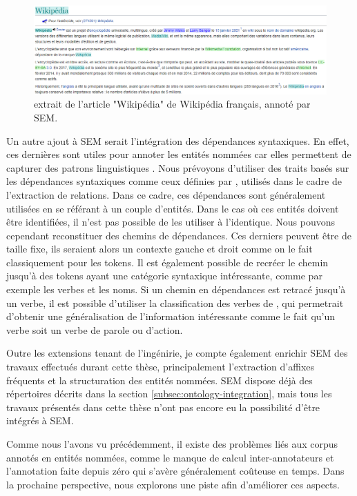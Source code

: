 \documentclass[PhD-Yoann-Dupont.tex]{subfiles}
\begin{document}
\begin{figure}[ht!]
\centering
\includegraphics[scale=0.5]{images/SEM/futur-sem-Wikipedia}
\caption{extrait de l'article "Wikipédia" de Wikipédia français, annoté par SEM.}
\label{fig:sem-wikipedia}
\end{figure}

Un autre ajout à SEM serait l'intégration des dépendances syntaxiques. En effet, ces dernières sont utiles pour annoter les entités nommées car elles permettent de capturer des patrons linguistiques \citep{nguyen2016j,jie2017efficient}. Nous prévoyons d'utiliser des traits basés sur les dépendances syntaxiques comme ceux définies par \citet{mintz2009distant}, utilisés dans le cadre de l'extraction de relations. Dans ce cadre, ces dépendances sont généralement utilisées en se référant à un couple d'entités. Dans le cas où ces entités doivent être identifiées, il n'est pas possible de les utiliser à l'identique. Nous pouvons cependant reconstituer des chemins de dépendances. Ces derniers peuvent être de taille fixe, ils seraient alors un contexte gauche et droit comme on le fait classiquement pour les tokens. Il est également possible de recréer le chemin jusqu'à des tokens ayant une catégorie syntaxique intéressante, comme par exemple les verbes et les noms. Si un chemin en dépendances est retracé jusqu'à un verbe, il est possible d'utiliser la classification des verbes de \citet{dubois1997synonymie}, qui permetrait d'obtenir une généralisation de l'information intéressante comme le fait qu'un verbe soit un verbe de parole ou d'action.

Outre les extensions tenant de l'ingénirie, je compte également enrichir SEM des travaux effectués durant cette thèse, principalement l'extraction d'affixes fréquents et la structuration des entités nommées. SEM dispose déjà des répertoires décrits dans la section \ref{subsec:ontology-integration}, mais tous les travaux présentés dans cette thèse n'ont pas encore eu la possibilité d'être intégrés à SEM.

Comme nous l'avons vu précédemment, il existe des problèmes liés aux corpus annotés en entités nommées, comme le manque de calcul inter-annotateurs et l'annotation faite depuis zéro qui s'avère généralement coûteuse en temps. Dans la prochaine perspective, nous explorons une piste afin d'améliorer ces aspects.
\end{document}
